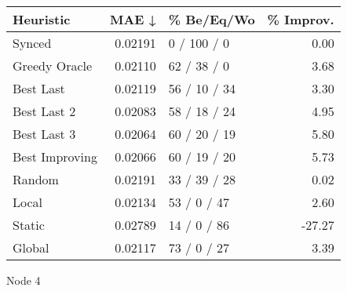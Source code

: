 \begin{tabular}{lrlr}
\toprule
\textbf{Heuristic} & \textbf{MAE ↓} & \textbf{\% Be/Eq/Wo} & \textbf{\% Improv.} \\
\midrule
            Synced &        0.02191 &          0 / 100 / 0 &                0.00 \\
     Greedy Oracle &        0.02110 &          62 / 38 / 0 &                3.68 \\
         Best Last &        0.02119 &         56 / 10 / 34 &                3.30 \\
       Best Last 2 &        0.02083 &         58 / 18 / 24 &                4.95 \\
       Best Last 3 &        0.02064 &         60 / 20 / 19 &                5.80 \\
    Best Improving &        0.02066 &         60 / 19 / 20 &                5.73 \\
            Random &        0.02191 &         33 / 39 / 28 &                0.02 \\
             Local &        0.02134 &          53 / 0 / 47 &                2.60 \\
            Static &        0.02789 &          14 / 0 / 86 &              -27.27 \\
            Global &        0.02117 &          73 / 0 / 27 &                3.39 \\
\bottomrule
\end{tabular}
\caption{Node 4}
\label{tab:iid_lr01_le2_bs4_4}
